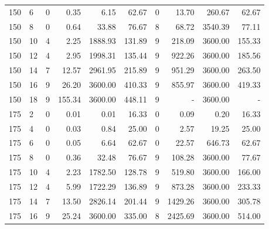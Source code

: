 \begin{appendices}
\begin{table*}
\begin{center}
\begin{tabular} {l l | r r r r | r r r r}
150 & 6   &  0            &  0.35          &  6.15        &  62.67     &  0           &  13.70           &  260.67     &  62.67     \\ 
150 & 8   &  0            &  0.64          &  33.88       &  76.67     &  8           &  68.72           &  3540.39    &  77.11     \\ 
150 & 10  &  4            &  2.25          &  1888.93     &  131.89    &  9           &  218.09          &  3600.00    &  155.33    \\ 
150 & 12  &  4            &  2.95          &  1998.31     &  135.44    &  9           &  922.26          &  3600.00    &  185.56    \\ 
150 & 14  &  7            &  12.57         &  2961.95     &  215.89    &  9           &  951.29          &  3600.00    &  263.50    \\ 
150 & 16  &  9            &  26.20         &  3600.00     &  410.33    &  9           &  855.97          &  3600.00    &  419.33    \\ 
150 & 18  &  9            &  155.34        &  3600.00     &  448.11    &  9           &  -               &  3600.00    &  -         \\ 
175 & 2   &  0            &  0.01          &  0.01        &  16.33     &  0           &  0.09            &  0.20       &  16.33     \\ 
175 & 4   &  0            &  0.03          &  0.84        &  25.00     &  0           &  2.57            &  19.25      &  25.00     \\ 
175 & 6   &  0            &  0.05          &  6.64        &  62.67     &  0           &  22.57           &  646.73     &  62.67     \\ 
175 & 8   &  0            &  0.36          &  32.48       &  76.67     &  9           &  108.28          &  3600.00    &  77.67     \\ 
175 & 10  &  4            &  2.23          &  1782.50     &  128.78    &  9           &  519.80          &  3600.00    &  166.00    \\ 
175 & 12  &  4            &  5.99          &  1722.29     &  136.89    &  9           &  873.28          &  3600.00    &  233.33    \\ 
175 & 14  &  7            &  13.50         &  2826.14     &  201.44    &  9           &  1429.26         &  3600.00    &  305.78    \\ 
175 & 16  &  9            &  25.24         &  3600.00     &  335.00    &  8           &  2425.69         &  3600.00    &  514.00    \\ 

\end{tabular}
\end{center}
\end{table*}
\end{appendices}
